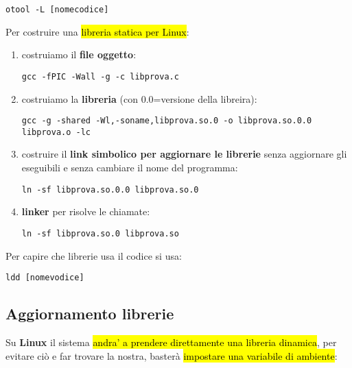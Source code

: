 \begin{lstlisting}
otool -L [nomecodice]
\end{lstlisting}


Per costruire una \hl{libreria statica per Linux}:

\begin{enumerate}
	\item costruiamo il \textbf{file oggetto}:

\begin{lstlisting}
gcc -fPIC -Wall -g -c libprova.c
\end{lstlisting}

	\item costruiamo la \textbf{libreria} (con 0.0=versione della libreira):

\begin{lstlisting}
gcc -g -shared -Wl,-soname,libprova.so.0 -o libprova.so.0.0 libprova.o -lc 
\end{lstlisting}

	\item costruire il \textbf{link simbolico per aggiornare le librerie} senza aggiornare gli eseguibili e senza cambiare il nome del programma:

\begin{lstlisting}
ln -sf libprova.so.0.0 libprova.so.0 
\end{lstlisting}

	\item \textbf{linker} per risolve le chiamate:

\begin{lstlisting}
ln -sf libprova.so.0 libprova.so
\end{lstlisting}

\end{enumerate}


Per capire che librerie usa il codice si usa:

\begin{lstlisting}
ldd [nomevodice]
\end{lstlisting}


\subsection{Aggiornamento librerie}

Su \textbf{Linux} il sistema \hl{andra' a prendere direttamente una libreria dinamica}, per evitare ciò e far trovare la nostra, basterà \hl{impostare una variabile di ambiente}:

